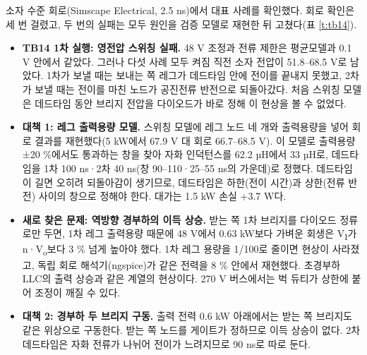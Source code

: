 소자 수준 회로(Simscape Electrical, 2.5 ns)에서 대표 사례를 확인했다. 회로 확인은 세 번 걸렸고, 두 번의 실패는 모두 원인을 검증 모델로 재현한 뒤 고쳤다(표 \ref{t:tb14}).

\begin{itemize}
\item \textbf{TB14 1차 실행: 영전압 스위칭 실패.} 48 V 조정과 전류 제한은 평균모델과 0.1 V 안에서 같았다. 그러나 다섯 사례 모두 켜짐 직전 소자 전압이 51.8–68.5 V로 남았다. 1차가 보낼 때는 보내는 쪽 레그가 데드타임 안에 전이를 끝내지 못했고, 2차가 보낼 때는 전이를 마친 노드가 공진전류 반전으로 되돌아갔다. 처음 스위칭 모델은 데드타임 동안 브리지 전압을 다이오드가 바로 정해 이 현상을 볼 수 없었다.
\item \textbf{대책 1: 레그 출력용량 모델.} 스위칭 모델에 레그 노드 네 개와 출력용량을 넣어 회로 결과를 재현했다(5 kW에서 67.9 V 대 회로 66.7–68.5 V). 이 모델로 출력용량 ±20 \%에서도 통과하는 창을 찾아 자화 인덕턴스를 62.2 µH에서 33 µH로, 데드타임을 1차 100 ns·2차 40 ns(창 90–110·25–55 ns의 가운데)로 정했다. 데드타임이 길면 오히려 되돌아감이 생기므로, 데드타임은 하한(전이 시간)과 상한(전류 반전) 사이의 창으로 정해야 한다. 대가는 1.5 kW 손실 +3.7 W다.
\item \textbf{새로 찾은 문제: 역방향 경부하의 이득 상승.} 받는 쪽 1차 브리지를 다이오드 정류로만 두면, 1차 레그 출력용량 때문에 48 V에서 0.63 kW보다 가벼운 회생은 V\textsubscript{I}가 n·V\textsubscript{o}보다 3 \% 넘게 높아야 했다. 1차 레그 용량을 1/100로 줄이면 현상이 사라졌고, 독립 회로 해석기(ngspice)가 같은 전력을 8 \% 안에서 재현했다. 초경부하 LLC의 출력 상승\cite{b19}과 같은 계열의 현상이다. 270 V 버스에서는 벅 듀티가 상한에 붙어 조정이 깨질 수 있다.
\item \textbf{대책 2: 경부하 두 브리지 구동.} 출력 전력 0.6 kW 아래에서는 받는 쪽 브리지도 같은 위상으로 구동한다. 받는 쪽 노드를 게이트가 정하므로 이득 상승이 없다. 2차 데드타임은 자화 전류가 나뉘어 전이가 느려지므로 90 ns로 따로 둔다.
\end{itemize}

